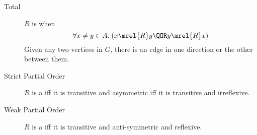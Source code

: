 \documentclass[handout]{mcs}
\begin{document}
\begin{pagesidebar}[to \textheight]
\begin{description}
\item[Total] $R$ is  when
\[
 \forall x \neq y \in A. \; (x \mrel{R} y \QOR y \mrel{R} x)
\]
Given any two vertices in $G$, there is an edge in one direction or the
other between them.

\item[Strict Partial Order] $R$ is a  iff
  it is transitive and asymmetric iff it is transitive and
  irreflexive.

\item[Weak Partial Order] $R$ is a  iff it is
  transitive and anti-symmetric and reflexive.

\end{description}
\end{pagesidebar}
\end{document}
